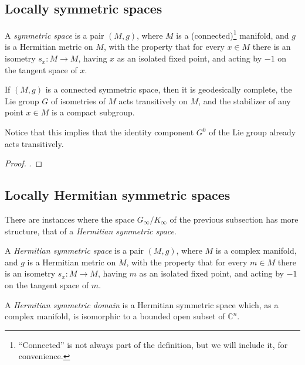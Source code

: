 \subsection{Locally symmetric spaces}
\label{subsection-locally-symmetric}

\begin{definition}
 \label{definition-symmetric}
A {\it symmetric space} is a pair $(M,g)$, where $M$ is a (connected)\footnote{``Connected'' is not always part of the definition, but we will include it, for convenience.} manifold, and $g$ is a Hermitian metric on $M$, with the property that for every $x\in M$ there is an isometry $s_x:M\to M$, having $x$ as an isolated fixed point, and acting by $-1$ on the tangent space of $x$. 
\end{definition}

\begin{lemma}
 \label{lemma-symmetric-homogeneous}
If $(M,g)$ is a connected symmetric space, then it is geodesically complete, the Lie group $G$ of isometries of $M$ acts transitively on $M$, and the stabilizer of any point $x\in M$ is a compact subgroup.
\end{lemma}

Notice that this implies that the identity component $G^0$ of the Lie group already acts transitively.

\begin{proof}
 \cite[Lemma 1.5 and Proposition 1.11]{Milne-Shimura}.
\end{proof}



\subsection{Locally Hermitian symmetric spaces}
\label{subsection-hermitian-symmetric}

There are instances where the space $G_\infty/K_\infty$ of the previous subsection has more structure, that of a \emph{Hermitian symmetric space}. 

\begin{definition}
 \label{definition-hermitian-symmetric}
A {\it Hermitian symmetric space} is a pair $(M,g)$, where $M$ is a complex manifold, and $g$ is a Hermitian metric on $M$, with the property that for every $m\in M$ there is an isometry $s_x:M\to M$, having $m$ as an isolated fixed point, and acting by $-1$ on the tangent space of $m$. 

A {\it Hermitian symmetric domain} is a Hermitian symmetric space which, as a complex manifold, is isomorphic to a bounded open subset of $\mathbb C^n$. 
\end{definition}

